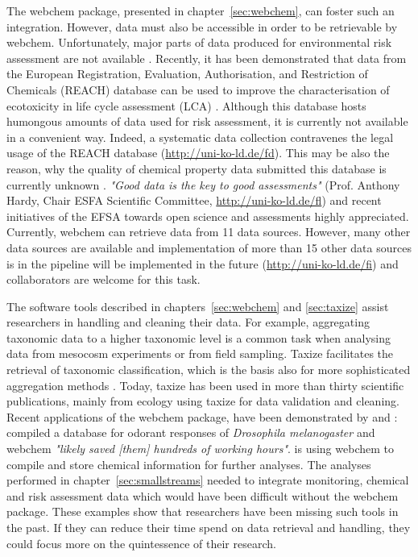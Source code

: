 The webchem package, presented in chapter~\ref{sec:webchem}, can foster such an integration.
However, data must also be accessible in order to be retrievable by webchem. 
Unfortunately, major parts of data produced for environmental risk assessment are not available \citep{schafer_letter_2013, dafforn_big_2015}. 
Recently, it has been demonstrated that data from the European Registration, Evaluation, Authorisation, and Restriction of Chemicals (REACH) database can be used to improve the characterisation of ecotoxicity in life cycle assessment (LCA) \citep{muller_exploring_2016}.
Although this database hosts humongous amounts of data used for risk assessment, it is currently not available in a convenient way.
Indeed, a systematic data collection contravenes the legal usage of the REACH database (\url{http://uni-ko-ld.de/fd}).
This may be also the reason, why the quality of chemical property data submitted this database is currently unknown \citep{stieger_assessing_2014, muller_exploring_2016}. 
\emph{"Good data is the key to good assessments"} (Prof. Anthony Hardy, Chair ESFA Scientific Committee, \url{http://uni-ko-ld.de/fl}) and recent initiatives of the EFSA towards open science and assessments highly appreciated. 
Currently, webchem can retrieve data from 11 data sources. 
However, many other data sources are available and implementation of more than 15 other data sources is in the pipeline will be implemented in the future (\url{http://uni-ko-ld.de/fi}) and collaborators are welcome for this task.

The software tools described in chapters~\ref{sec:webchem} and \ref{sec:taxize} assist researchers in handling and cleaning their data. 
For example, aggregating taxonomic data to a higher taxonomic level is a common task when analysing data from mesocosm experiments or from field sampling.
Taxize facilitates the retrieval of taxonomic classification, which is the basis also for more sophisticated aggregation methods \citep{cuffney_ambiguous_2007}. 
Today, taxize has been used in more than thirty scientific publications, mainly from ecology using taxize for data validation and cleaning.
Recent applications of the webchem package, have been demonstrated by \citet{munch_door_2016} and \citet{ranke_chents_2016}: 
\citet{munch_door_2016} compiled a database for odorant responses of \textit{Drosophila melanogaster} and webchem \emph{"likely saved [them] hundreds of working hours"}. 
\citet{ranke_chents_2016} is using webchem to compile and store chemical information for further analyses. 
The analyses performed in chapter~\ref{sec:smallstreams} needed to integrate monitoring, chemical and risk assessment data which would have been difficult without the webchem package. 
These examples show that researchers have been missing such tools in the past.
If they can reduce their time spend on data retrieval and handling, they could focus more on the quintessence of their research. 


